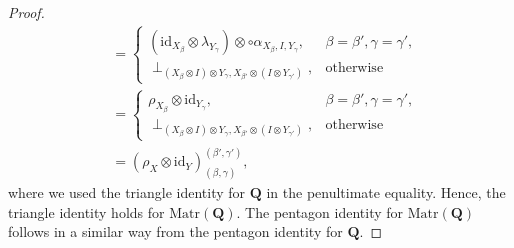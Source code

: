 \documentclass[12pt]{tac}
\theoremstyle{definition}
\theoremstyle{remark}
\newcommand{\<}{\langle}
\renewcommand{\>}{\rangle}
\renewcommand{\:}{\colon}
\newcommand{\id}{\mathrm{id}}
\begin{document}
\begin{proof}
\begin{align*}
    & = \begin{cases}
    (\id_{X_\beta}\otimes\lambda_{Y_\gamma})\otimes\circ \alpha_{X_\beta,I,Y_\gamma}, & \beta=\beta',\gamma=\gamma',\\
    \perp_{(X_\beta\otimes I)\otimes Y_\gamma,X_{\beta'}\otimes(I\otimes Y_{\gamma'})}, & \text{otherwise}
        \end{cases}\\
         & = \begin{cases}
    \rho_{X_\beta}\otimes\id_{Y_\gamma}, & \beta=\beta',\gamma=\gamma',\\
    \perp_{(X_\beta\otimes I)\otimes Y_\gamma,X_{\beta'}\otimes(I\otimes
    Y_{\gamma'})}, & \text{otherwise}
        \end{cases}\\
        & = (\rho_X\otimes \id_Y)^{(\beta',\gamma')}_{(\beta,\gamma)},
\end{align*}
where we used the triangle identity for $\mathbf Q$ in the penultimate equality. Hence, the triangle identity holds for $\mathrm{Matr}(\mathbf Q)$.
The pentagon identity for $\mathrm{Matr}(\mathbf Q)$ follows in a similar way from the pentagon identity for $\mathbf Q$. 


\end{proof}
\end{document}
